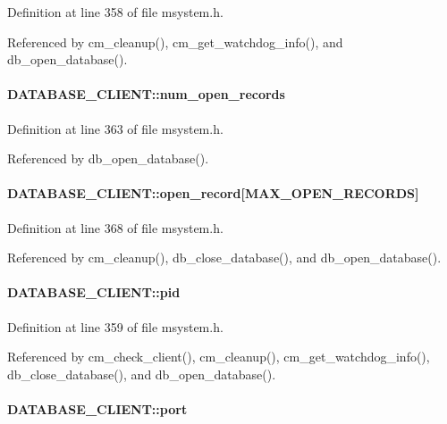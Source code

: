 Definition at line 358 of file msystem.h.

Referenced by cm\_\-cleanup(), cm\_\-get\_\-watchdog\_\-info(), and db\_\-open\_\-database().
\paragraph[{num\_\-open\_\-records}]{ {\bf DATABASE\_\-CLIENT::num\_\-open\_\-records}}\hfill\label{structDATABASE__CLIENT_aba2a2d06fb62fd41b408cbeeafd295d9}


Definition at line 363 of file msystem.h.

Referenced by db\_\-open\_\-database().
\paragraph[{open\_\-record}]{ {\bf DATABASE\_\-CLIENT::open\_\-record}\mbox{[}MAX\_\-OPEN\_\-RECORDS\mbox{]}}\hfill\label{structDATABASE__CLIENT_a92d142a629b2ec654d2b3c2fe7765bde}


Definition at line 368 of file msystem.h.

Referenced by cm\_\-cleanup(), db\_\-close\_\-database(), and db\_\-open\_\-database().
\paragraph[{pid}]{ {\bf DATABASE\_\-CLIENT::pid}}\hfill\label{structDATABASE__CLIENT_a89a8f4645035336e4c9c41a2b1f0a3fd}


Definition at line 359 of file msystem.h.

Referenced by cm\_\-check\_\-client(), cm\_\-cleanup(), cm\_\-get\_\-watchdog\_\-info(), db\_\-close\_\-database(), and db\_\-open\_\-database().
\paragraph[{port}]{ {\bf DATABASE\_\-CLIENT::port}}\hfill\label{structDATABASE__CLIENT_a6aac409aa7127851ca8c310f3652ffb4}



